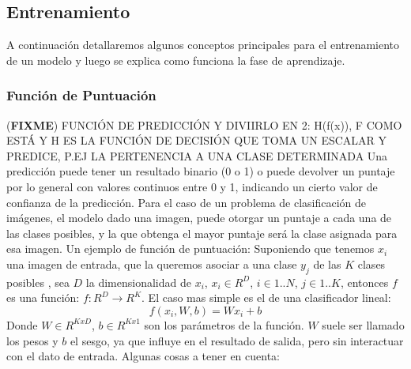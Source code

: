 \documentclass[a4paper,11pt,spanish]{book}
\newcommand*{\FIXME}[1]{{(\textbf{FIXME}) {#1}}}
\begin{document}
      \subsection{Entrenamiento}
	A continuación detallaremos algunos conceptos principales para el entrenamiento de un modelo y luego se explica como funciona la fase de aprendizaje.
	\subsubsection{Función de Puntuación}
        \FIXME{FUNCIÓN DE PREDICCIÓN Y DIVIIRLO EN 2: H(f(x)), F COMO ESTÁ Y H
          ES LA FUNCIÓN DE DECISIÓN QUE TOMA UN ESCALAR Y PREDICE, P.EJ LA
          PERTENENCIA A UNA CLASE DETERMINADA}
	  Una predicción puede tener un resultado binario (0 o 1) o puede devolver un puntaje por lo general con valores continuos entre 0 y 1, indicando un cierto valor de confianza
	  de la predicción. Para el caso de un problema de clasificación de imágenes, el modelo dado una imagen, puede otorgar un puntaje a cada una de las clases posibles,
	  y la que obtenga el mayor puntaje será la clase asignada para esa imagen.
	  Un ejemplo de función de puntuación:
	  Suponiendo que tenemos $x_{i}$  una imagen de entrada, que la queremos asociar a una clase $y_{j}$ de las $K$ clases posibles , sea $D$ la dimensionalidad de $x_{i}$, $x_{i} \in R^D$,
	  $i \in 1..N$, $j \in 1..K$, entonces $f$ es una función: $f:R^D {\rightarrow} R^K$. El caso mas simple es el de una clasificador lineal:\\
	  \begin{equation}
	    f(x_{i}, W, b) = W x_{i} + b
	  \end{equation}
	  Donde $W \in R^{KxD}$, $b \in R^{Kx1}$ son los parámetros de la función. $W$ suele ser llamado los pesos y $b$ el sesgo, ya que influye en el resultado de salida, pero sin
	  interactuar con el dato de entrada.
	  Algunas cosas a tener en cuenta:
\end{document}
